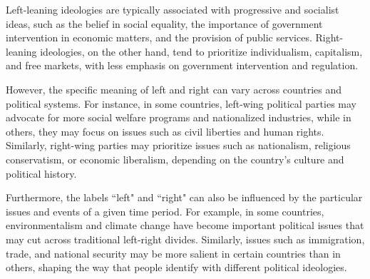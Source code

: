 Left-leaning ideologies are typically associated with progressive and socialist ideas, such as the belief in social equality, the importance of government intervention in economic matters, and the provision of public services.
Right-leaning ideologies, on the other hand, tend to prioritize individualism, capitalism, and free markets, with less emphasis on government intervention and regulation.

However, the specific meaning of left and right can vary across countries and political systems.
For instance, in some countries, left-wing political parties may advocate for more social welfare programs and nationalized industries, while in others, they may focus on issues such as civil liberties and human rights.
Similarly, right-wing parties may prioritize issues such as nationalism, religious conservatism, or economic liberalism, depending on the country's culture and political history.

Furthermore, the labels ``left" and ``right" can also be influenced by the particular issues and events of a given time period.
For example, in some countries, environmentalism and climate change have become important political issues that may cut across traditional left-right divides.
Similarly, issues such as immigration, trade, and national security may be more salient in certain countries than in others, shaping the way that people identify with different political ideologies.







\begin{table}[ht]
    \centering
    \caption{Example of Left and Right positions according to AllSides.}
    \label{tab:allsides_leaning_positions}
\end{table}


